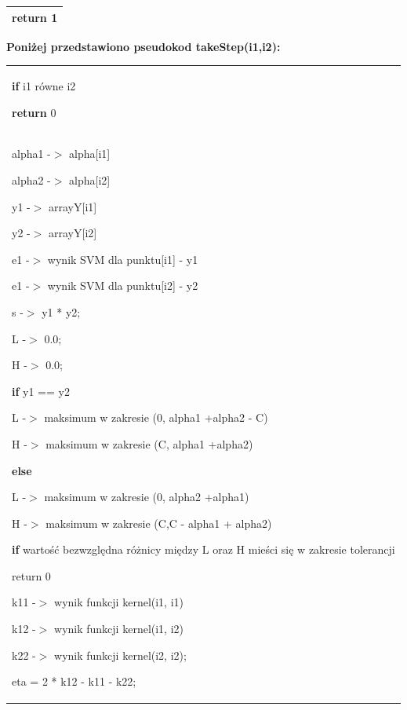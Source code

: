 \documentclass[[10pt,a4paper]{article}
\begin{document}
\begin{enumerate}
\begin{tabular}{|p{11.5cm}|}
    \hspace{4em}return 1

\noindent 
\\ \hline
\end{tabular}
\newline
\noindent \textbf{Poniżej przedstawiono pseudokod takeStep(i1,i2):}\\
\begin{tabular}{|p{11.5cm}|} \hline
\noindent \textbf{if} i1 równe i2 
 
 \hspace{1em}\textbf {return} 0\\
 alpha1 -$>$ alpha[i1]

\noindent alpha2 -$>$ alpha[i2]

\noindent y1 -$>$ arrayY[i1]

\noindent y2 -$>$ arrayY[i2]

\noindent e1 -$>$ wynik SVM dla punktu[i1] - y1

\noindent e1 -$>$ wynik SVM dla punktu[i2] - y2

\noindent s -$>$ y1 * y2;

\noindent L -$>$ 0.0;

\noindent H -$>$ 0.0;

\noindent \textbf{if }y1 == y2

\hspace{1em} L -$>$ maksimum w zakresie (0, alpha1 +alpha2 - C)

\hspace{1em} H -$>$ maksimum w zakresie (C, alpha1 +alpha2)

\noindent \textbf{else }

 \hspace{1em}L -$>$ maksimum w zakresie (0, alpha2 +alpha1)

 \hspace{1em}H -$>$ maksimum w zakresie (C,C - alpha1 + alpha2)

\noindent \textbf{if} warto\'{s}\'{c} bezwzgl\k{e}dna różnicy między L oraz H mieści się w zakresie tolerancji

 \hspace{1em}return 0 

\noindent k11 -$>$ wynik funkcji kernel(i1, i1)

\noindent k12 -$>$ wynik funkcji kernel(i1, i2)

\noindent k22 -$>$ wynik funkcji kernel(i2, i2);

\noindent eta = 2 * k12 - k11 - k22;


\end{tabular}
\end{enumerate}
\end{document}

